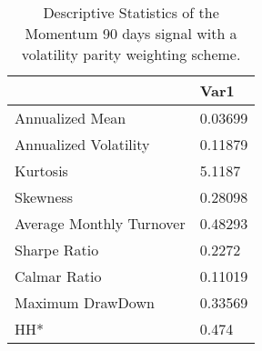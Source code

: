 \begin{table}[H]
\centering
\begin{tabular}{ll}
\hline& Var1 \\ 
\hline 
Annualized Mean & 0.03699 \\ 
Annualized Volatility & 0.11879 \\ 
Kurtosis & 5.1187 \\ 
Skewness & 0.28098 \\ 
Average Monthly Turnover & 0.48293 \\ 
Sharpe Ratio & 0.2272 \\ 
Calmar Ratio & 0.11019 \\ 
Maximum DrawDown & 0.33569 \\ 
HH* & 0.474 \\ 
\hline
\end{tabular}
\caption{Descriptive Statistics of the Momentum 90 days signal with a volatility parity weighting scheme.}
\label{MOM90VP}
\end{table}